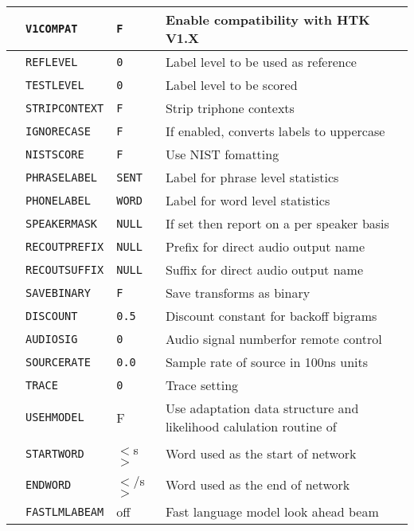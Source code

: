 \begin{center}
\begin{supertabular}{|p{1.4cm}|l|l|p{6.6cm}|}
 & \texttt{V1COMPAT} & \texttt{F} & Enable compatibility with HTK V1.X \\ \hline

  & \texttt{REFLEVEL} & \texttt{0} & Label level to be used as reference \\ 
  & \texttt{TESTLEVEL} & \texttt{0} & Label level to be scored \\ 
  & \texttt{STRIPCONTEXT} & \texttt{F} & Strip triphone contexts \\ 
 & \texttt{IGNORECASE} & \texttt{F} & If enabled,
  converts labels to uppercase \\ 
  & \texttt{NISTSCORE} & \texttt{F} & Use NIST fomatting \\ 
  & \texttt{PHRASELABEL} & \texttt{SENT} & Label for phrase level statistics \\ 
  & \texttt{PHONELABEL} & \texttt{WORD} & Label for word level statistics \\ 
  & \texttt{SPEAKERMASK} & \texttt{NULL} & If set then report on a per
  speaker basis \\ \hline 

  & \texttt{RECOUTPREFIX} & \texttt{NULL} & Prefix for direct
  audio output name \\ 
 & \texttt{RECOUTSUFFIX} & \texttt{NULL} & Suffix for direct audio output name\\ 
  & \texttt{SAVEBINARY} & \texttt{F} & Save transforms as binary \\ \hline

 & \texttt{DISCOUNT} & \texttt{0.5} & Discount constant
  for backoff bigrams\\ \hline

  & \texttt{AUDIOSIG} & \texttt{0} & Audio signal numberfor remote control 
  \\ 
  & \texttt{SOURCERATE} & \texttt{0.0} & Sample rate of source in 100ns units 
  \\ \hline

  & \texttt{TRACE} & \texttt{0} & Trace setting\\ \hline

& \texttt{USEHMODEL} & F & Use adaptation data structure and likelihood calulation routine of 
 \\
 & \texttt{STARTWORD} & $<$s$>$ & Word used as the start of network \\
 & \texttt{ENDWORD} & $<$/s$>$ & Word used as the end of network \\
 & \texttt{FASTLMLABEAM} & off & Fast language model look ahead beam \\\hline

\end{supertabular}
\end{center}
\clearpage


